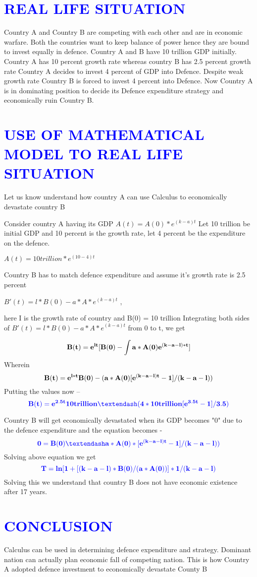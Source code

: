 \documentclass[12pt]{article}
\begin{document}
\section{\textcolor{blue}{REAL LIFE SITUATION}}
\textsf
Country A and Country B are competing with each other and are in economic warfare. Both the 
countries want to keep balance of power hence they are bound to invest equally in defence.
Country A and B have 10 trillion GDP initially.
Country A has 10 percent growth rate whereas country B has 2.5 percent growth rate
Country A decides to invest 4 percent of GDP into Defence. Despite weak growth rate
Country B is forced to invest 4 percent into Defence.
Now Country A is in dominating position to decide its Defence expenditure strategy and
economically ruin Country B.


\section{\textcolor{blue}{USE OF MATHEMATICAL MODEL TO REAL LIFE SITUATION}}
\textsf
Let us know understand how country A can use Calculus to economically devastate country B

Consider country A having its GDP $A(t) = A(0)*e^{(k-a)t}$
Let 10 trillion be initial GDP and 10 percent is the growth rate, let 4 percent be the expenditure on the defence.

$A(t) = 10 trillion * e^{(10-4)t}$

Country B has to match defence expenditure and assume it’s growth rate is 2.5 percent

$B'(t) = l*B(0) - a * A * e^{(k-a)t}$ ,

here I is the growth rate of country and B(0) = 10 trillion
Integrating both sides of $B'(t) = l*B(0)-{a*A*e}^{(k-a)t}$ from 0 to t, we get 

\textcolor{blue}
{
\[
\mathbf
{
B(t) = e^{lt}[B(0)-\int{a*A(0)e^{(k-a-l)*t}}] \\
}
\]
}
Wherein \\
\textcolor{blue}
{
\[
\mathbf
{
B(t) = e^{l*t}{B(0)-(a*A(0)[e^{(k-a-l)t}-1]/(k-a-l))} \\
}
\]
}
Putting the values now – 
\[
\textcolor{blue}
{
\mathbf
{
B(t) = e^{2.5t}{10 trillion – (4*10 trillion[e^{3.5t} - 1]/3.5)}
}
}
\]

Country B will get economically devastated when its GDP becomes "0" 
due to the defence expenditure and the equation becomes - 
\[
\textcolor{blue}
{
\mathbf
{
0 = B(0) – a*A(0)*[e^{(k-a-l)t}-1]/(k-a-l))
}
}
\]
Solving above equation we get 
\[
\textcolor{blue}
{
\mathbf
{
T = ln[1 + [(k-a-l) *B(0) /( a*A(0))]*1/(k-a-l)
}
}
\]
Solving this we understand that country B does not have economic existence after 17 years.

\section{\textcolor{blue}{CONCLUSION}}
\textsf
{
Calculus can be used in determining defence expenditure and strategy. Dominant nation can actually plan economic fall of competing nation. This is how
Country A adopted defence investment to economically devastate County B
}


\end{document}
